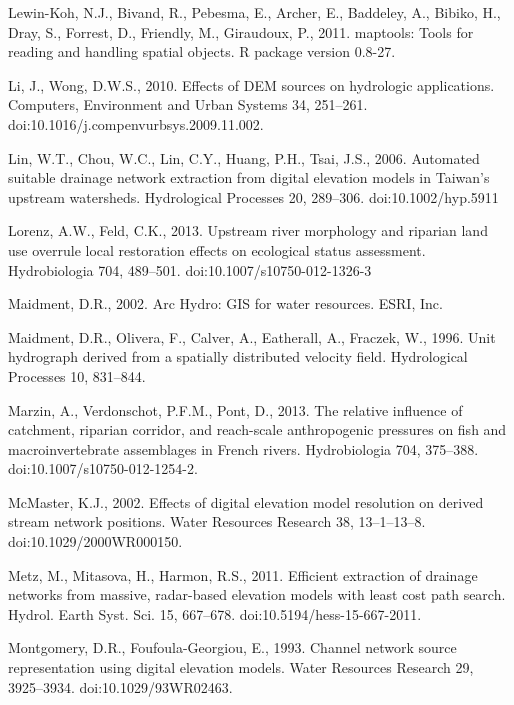 \begin{thebibliography}
\bibitem{} \hangindent=1cm Lewin-Koh, N.J., Bivand, R., Pebesma, E., Archer, E., Baddeley, A., Bibiko, H., Dray, S., Forrest, D., Friendly, M., Giraudoux, P., 2011. maptools: Tools for reading and handling spatial objects. R package version 0.8-27.

\bibitem{} \hangindent=1cm Li, J., Wong, D.W.S., 2010. Effects of DEM sources on hydrologic applications. Computers, Environment and Urban Systems 34, 251–261. doi:10.1016/j.compenvurbsys.2009.11.002.

\bibitem{} \hangindent=1cm Lin, W.T., Chou, W.C., Lin, C.Y., Huang, P.H., Tsai, J.S., 2006. Automated suitable drainage network extraction from digital elevation models in Taiwan’s upstream watersheds. Hydrological Processes 20, 289–306. doi:10.1002/hyp.5911

\bibitem{} \hangindent=1cm Lorenz, A.W., Feld, C.K., 2013. Upstream river morphology and riparian land use overrule local restoration effects on ecological status assessment. Hydrobiologia 704, 489–501. doi:10.1007/s10750-012-1326-3

\bibitem{} \hangindent=1cm Maidment, D.R., 2002. Arc Hydro: GIS for water resources. ESRI, Inc.

\bibitem{} \hangindent=1cm Maidment, D.R., Olivera, F., Calver, A., Eatherall, A., Fraczek, W., 1996. Unit hydrograph derived from a spatially distributed velocity field. Hydrological Processes 10, 831–844.

\bibitem{} \hangindent=1cm Marzin, A., Verdonschot, P.F.M., Pont, D., 2013. The relative influence of catchment, riparian corridor, and reach-scale anthropogenic pressures on fish and macroinvertebrate assemblages in French rivers. Hydrobiologia 704, 375–388. doi:10.1007/s10750-012-1254-2.

\bibitem{} \hangindent=1cm McMaster, K.J., 2002. Effects of digital elevation model resolution on derived stream network positions. Water Resources Research 38, 13–1–13–8. doi:10.1029/2000WR000150.

\bibitem{} \hangindent=1cm Metz, M., Mitasova, H., Harmon, R.S., 2011. Efficient extraction of drainage networks from massive, radar-based elevation models with least cost path search. Hydrol. Earth Syst. Sci. 15, 667–678. doi:10.5194/hess-15-667-2011.

\bibitem{} \hangindent=1cm Montgomery, D.R., Foufoula-Georgiou, E., 1993. Channel network source representation using digital elevation models. Water Resources Research 29, 3925–3934. doi:10.1029/93WR02463.


\end{thebibliography}
